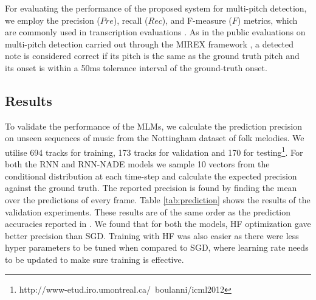 For evaluating the performance of the proposed system for multi-pitch detection, we employ the precision ($\mathit{Pre}$), recall ($\mathit{Rec}$), and F-measure ($\mathit{F}$) metrics, which are commonly used in transcription evaluations \cite{MIREX}.
As in the public evaluations on multi-pitch detection carried out through the MIREX framework \cite{MIREX}, a detected note is considered correct if its pitch is the same as the ground truth pitch and its onset is within a 50ms tolerance interval of the ground-truth onset.

\subsection{Results}

To validate the performance of the MLMs, we calculate the prediction precision on unseen sequences of music from the Nottingham dataset of folk melodies. We utilise 694 tracks for training, 173 tracks for validation and 170 for testing\footnote{http://www-etud.iro.umontreal.ca/~boulanni/icml2012}. For both the RNN and RNN-NADE models we sample 10 vectors from the conditional distribution at each time-step and calculate the expected precision against the ground truth. The reported precision is found by finding the mean over the predictions of every frame. Table \ref{tab:prediction} shows the results of the validation experiments. These results are of the same order as the prediction accuracies reported in \cite{Boulanger-Lewandowski2012}. We found that for both the models, HF optimization gave better precision than SGD. Training with HF was also easier as there were less hyper parameters to be tuned when compared 
to SGD, where learning rate needs to be updated to make sure training is effective. 

\begin{table}[t]
 \begin{center}
\end{center}
 \caption{Validation results for MLMs}
 \label{tab:prediction}
\end{table}


